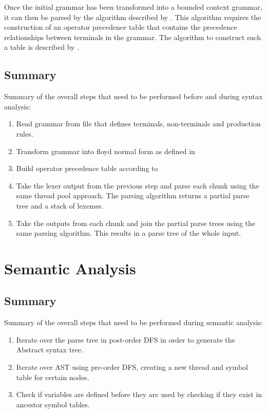 Once the initial grammar has been transformed into a bounded context grammar, it
can then be parsed by the algorithm described by \cite{barenghi_parallel_2015}.
This algorithm requires the construction of an operator precedence table that
contains the precedence relationships between terminals in the grammar. The
algorithm to construct such a table is described by \cite{grune_parsing_2008}.



\subsection{Summary}
Summary of the overall steps that need to be performed before and during syntax
analysis:

\begin{enumerate}
	\item Read grammar from file that defines terminals, non-terminals and
  		  production rules.
	\item Transform grammar into floyd normal form as defined in
		  \cite{barenghi_parallel_2015}
	\item Build operator precedence table according to \cite{grune_parsing_2008}
	\item Take the lexer output from the previous step and parse each chunk using 		
		  the same thread pool approach. The parsing algorithm returns a partial parse 		
          tree and a stack of lexemes.
	\item Take the outputs from each chunk and join the partial parse trees using
		  the same parsing algorithm. This results in a parse tree of the whole input.
\end{enumerate}

\section{Semantic Analysis} \label{design_analyser}


\subsection{Summary}
Summary of the overall steps that need to be performed during semantic
analysis:

\begin{enumerate}
	\item Iterate over the parse tree in post-order DFS in order to generate the Abstract syntax tree.
	\item Iterate over AST using pre-order DFS, creating a new thread and symbol table for certain nodes.
	\item Check if variables are defined before they are used by checking if they exist in ancestor symbol tables.
\end{enumerate}



